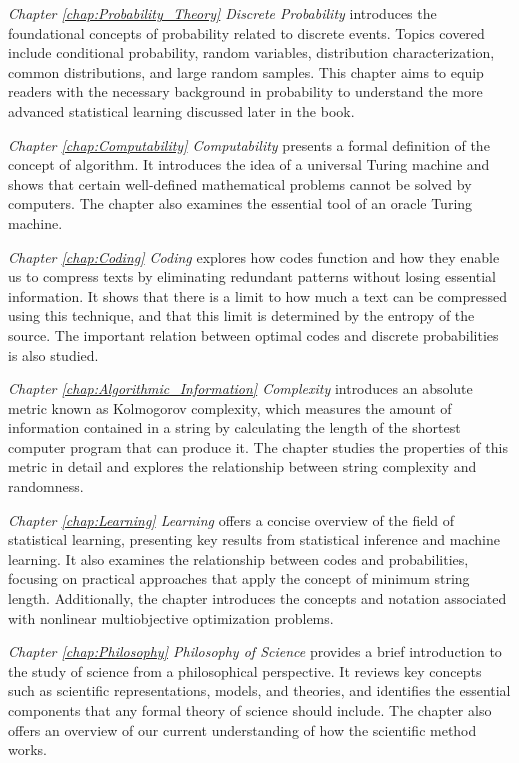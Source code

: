 \emph{Chapter \ref{chap:Probability_Theory} Discrete Probability} introduces the foundational concepts of probability related to discrete events. Topics covered include conditional probability, random variables, distribution characterization, common distributions, and large random samples. This chapter aims to equip readers with the necessary background in probability to understand the more advanced statistical learning discussed later in the book.

\emph{Chapter \ref{chap:Computability} Computability} presents a formal definition of the concept of algorithm. It introduces the idea of a universal Turing machine and shows that certain well-defined mathematical problems cannot be solved by computers. The chapter also examines the essential tool of an oracle Turing machine.

\emph{Chapter \ref{chap:Coding} Coding} explores how codes function and how they enable us to compress texts by eliminating redundant patterns without losing essential information. It shows that there is a limit to how much a text can be compressed using this technique, and that this limit is determined by the entropy of the source. The important relation between optimal codes and discrete probabilities is also studied.

\emph{Chapter \ref{chap:Algorithmic_Information} Complexity} introduces an absolute metric known as Kolmogorov complexity, which measures the amount of information contained in a string by calculating the length of the shortest computer program that can produce it. The chapter studies the properties of this metric in detail and explores the relationship between string complexity and randomness.

\emph{Chapter \ref{chap:Learning} Learning} offers a concise overview of the field of statistical learning, presenting key results from statistical inference and machine learning. It also examines the relationship between codes and probabilities, focusing on practical approaches that apply the concept of minimum string length. Additionally, the chapter introduces the concepts and notation associated with nonlinear multiobjective optimization problems.

\emph{Chapter \ref{chap:Philosophy} Philosophy of Science} provides a brief introduction to the study of science from a philosophical perspective. It reviews key concepts such as scientific representations, models, and theories, and identifies the essential components that any formal theory of science should include. The chapter also offers an overview of our current understanding of how the scientific method works.

